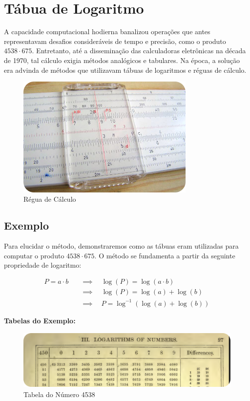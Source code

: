 \section{Tábua de Logaritmo}


A capacidade computacional hodierna banalizou operações que antes representavam desafios consideráveis de tempo e precisão, como o produto $4538 \cdot 675$. Entretanto, até a disseminação das calculadoras eletrônicas na década de 1970, tal cálculo exigia métodos analógicos e tabulares. Na época, a solução era advinda de métodos que utilizavam tábuas de logaritmos e réguas de cálculo.

\begin{figure}[H]
    \centering
    \includegraphics[height=6cm]{img/regua.png}
    \caption{Régua de Cálculo}
\end{figure}

\subsection{Exemplo}

Para elucidar o método, demonstraremos como as tábuas eram utilizadas para computar o produto $4538\cdot 675$. O método se fundamenta a partir da seguinte propriedade de logaritmo:

\begin{align*}
    P = a \cdot b \quad & \implies \quad \log(P) = \log(a \cdot b) \\
                       & \implies \quad \log(P) = \log(a) + \log(b) \\
                       & \implies \quad P = \log^{-1}\left( \log(a) + \log(b) \right)
\end{align*}

\textbf{Tabelas do Exemplo:}
\begin{figure}[H]
    \centering
    \includegraphics[height=3cm]{img/4538.png}
    \caption{Tabela do Número 4538}
\end{figure}

